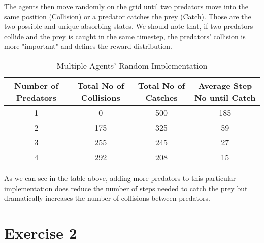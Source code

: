 \documentclass[a4paper,11pt]{article}
\begin{document}
The agents then move randomly on the grid until two predators move into the same position (Collision) or a predator catches the prey (Catch). Those are the two possible and unique absorbing states. We should note that, if two predators collide and the prey is caught in the same timestep, the predators' collision is more "important" and defines the reward distribution.



\begin{table}[h]
\begin{center}
\caption{Multiple Agents' Random Implementation}
\begin{tabular}{c c c c} 
\hline\hline               
Number of Predators & Total No of Collisions & Total No of Catches & Average Step No until Catch \\  
\hline
1 & 0 & 500 & 185\\ 
2 & 175 & 325  & 59\\
3 & 255 & 245   & 27\\
4 & 292 & 208 & 15 \\ 
\end{tabular}
\label{table:multirandom} 
\end{center} 
\end{table} 
\begin{center}

\end{center}

As we can see in the table above, adding more predators to this particular implementation does reduce the number of steps needed to catch the prey but dramatically increases the number of collisions between predators.
 

\section*{Exercise 2}
\end{document}
